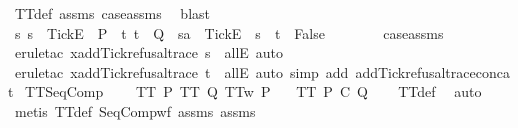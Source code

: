 \begin{isabellebody}
{\ TT{}{\isacharunderscore}def\ assms{\isacharparenleft}{}{\isacharparenright}\ case{\isacharunderscore}assms{\isacharparenleft}{}{\isacharparenright}\ \isamarkupfalse%
\ blast\isanewline
\ \ \isamarkupfalse%
\ {\isachardoublequoteopen}{\isasymforall}s{\isachardot}\ s\ {\isacharat}\ {\isacharbrackleft}{\isacharbrackleft}Tick{\isacharbrackright}\isactrlsub E{\isacharbrackright}\ {\isasymin}\ P\ {\isasymlongrightarrow}\ {\isacharparenleft}{\isasymforall}t{\isachardot}\ t\ {\isasymin}\ Q\ {\isasymlongrightarrow}\ sa\ {\isacharat}\ {\isacharbrackleft}{\isacharbrackleft}Tick{\isacharbrackright}\isactrlsub E{\isacharbrackright}\ {\isasymnoteq}\ s\ {\isacharat}\ t{\isacharparenright}\ {\isasymLongrightarrow}\ False{\isachardoublequoteclose}\isanewline
\ \ \ \ \isamarkupfalse%
\ {}\ {}\ case{\isacharunderscore}assms\ \isamarkupfalse%
\ {\isacharparenleft}erule{\isacharunderscore}tac\ x{\isacharequal}{\isachardoublequoteopen}add{\isacharunderscore}Tick{\isacharunderscore}refusal{\isacharunderscore}trace\ s{\isachardoublequoteclose}\ \ allE{\isacharcomma}\ auto{\isacharparenright}\isanewline
\ \ \ \ \isamarkupfalse%
\ {\isacharparenleft}erule{\isacharunderscore}tac\ x{\isacharequal}{\isachardoublequoteopen}add{\isacharunderscore}Tick{\isacharunderscore}refusal{\isacharunderscore}trace\ t{\isachardoublequoteclose}\ \ allE{\isacharcomma}\ auto\ simp\ add{\isacharcolon}\ add{\isacharunderscore}Tick{\isacharunderscore}refusal{\isacharunderscore}trace{\isacharunderscore}concat{\isacharparenright}\isanewline
{}\isamarkupfalse%
%
\endisatagproof
{\isafoldproof}%
%
\isadelimproof
%
\endisadelimproof
%
}%
\isamarkupfalse%
\ TT{\isacharunderscore}SeqComp{\isacharcolon}\ \isanewline
\ \ \ {\isachardoublequoteopen}TT\ P{\isachardoublequoteclose}\ {\isachardoublequoteopen}TT\ Q{\isachardoublequoteclose}\ {\isachardoublequoteopen}TT{}w\ P{\isachardoublequoteclose}\isanewline
\ \ \ {\isachardoublequoteopen}TT\ {\isacharparenleft}P\ {\isacharsemicolon}\isactrlsub C\ Q{\isacharparenright}{\isachardoublequoteclose}\isanewline
%
\isadelimproof
\ \ %
\endisadelimproof
%
\isatagproof
{}\isamarkupfalse%
\ TT{\isacharunderscore}def\ \isamarkupfalse%
\ auto\isanewline
\ \ \isamarkupfalse%
\ {\isacharparenleft}metis\ TT{\isacharunderscore}def\ SeqComp{\isacharunderscore}wf\ assms{\isacharparenleft}{}{\isacharparenright}\ assms{\isacharparenleft}{}{\isacharparenright}{\isacharparenright}\isanewline

\end{isabellebody}
